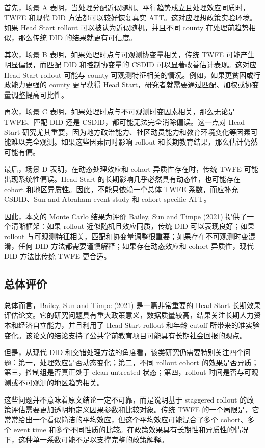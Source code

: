 \documentclass[
  fontset=windows]{ctexart}
\begin{document}
首先，场景 A
表明，当处理分配近似随机、平行趋势成立且处理效应同质时，TWFE 和现代 DID
方法都可以较好恢复真实 ATT。这对应理想政策实验环境。如果 Head Start
rollout 可以被认为近似随机，并且不同 county 在处理前趋势相似，那么传统
DID 的结果就更有可信度。

其次，场景 B 表明，如果处理时点与可观测协变量相关，传统 TWFE
可能产生明显偏误，而匹配 DID 和控制协变量的 CSDID
可以显著改善估计表现。这对应 Head Start rollout 可能与 county
可观测特征相关的情况。例如，如果更贫困或行政能力更强的 county 更早获得
Head Start，研究者就需要通过匹配、加权或协变量调整提高可比性。

再次，场景 C 表明，如果处理时点与不可观测时变因素相关，那么无论是
TWFE、匹配 DID 还是 CSDID，都可能无法完全消除偏误。这一点对 Head Start
研究尤其重要，因为地方政治能力、社区动员能力和教育环境变化等因素可能难以完全观测。如果这些因素同时影响
rollout 和长期教育结果，那么估计仍然可能有偏。

最后，场景 D 表明，在动态处理效应和 cohort 异质性存在时，传统 TWFE
可能出现系统性偏误。Head Start 的长期影响几乎必然具有动态性，也可能存在
cohort 和地区异质性。因此，不能只依赖一个总体 TWFE 系数，而应补充
CSDID、Sun and Abraham event study 和 cohort-specific ATT。

因此，本文的 Monte Carlo 结果为评价 Bailey, Sun and Timpe (2021)
提供了一个清晰框架：如果 rollout 近似随机且效应同质，传统 DID
可以表现良好；如果 rollout
与可观测特征相关，匹配和协变量调整很重要；如果存在不可观测时变混淆，任何
DID 方法都需要谨慎解释；如果存在动态效应和 cohort 异质性，现代 DID
方法比传统 TWFE 更合适。

\subsection{总体评价}\label{ux603bux4f53ux8bc4ux4ef7}

总体而言，Bailey, Sun and Timpe (2021) 是一篇非常重要的 Head Start
长期效果评估论文。它的研究问题具有重大政策意义，数据质量较高，结果关注长期人力资本和经济自立能力，并且利用了
Head Start rollout 和年龄 cutoff
所带来的准实验变化。该论文的结论支持了公共学前教育项目可能具有长期社会回报的观点。

但是，从现代 DID
和交错处理方法的角度看，该类研究仍需要特别关注四个问题：第一，处理效应是否动态变化；第二，不同
rollout cohort 的效果是否异质；第三，控制组是否真正处于 clean untreated
状态；第四，rollout 时间是否与可观测或不可观测的地区趋势相关。

这些问题并不意味着原文结论一定不可靠，而是说明基于 staggered rollout
的政策评估需要更加透明地定义因果参数和比较对象。传统 TWFE
的一个局限是，它常常给出一个看似简洁的平均效应，但这个平均效应可能混合了多个
cohort、多个 event time
和多个不同性质的比较。在政策效果具有长期性和异质性的情况下，这种单一系数可能不足以支撑完整的政策解释。
\end{document}
